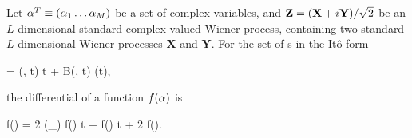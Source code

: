 \begin{theorem}
\label{thm:fpe-sde:ito-formula:ito-f-complex}
	Let $\mathbf{\alpha}^T \equiv (\alpha_1 \ldots \alpha_M)$ be a set of complex variables, and $\mathbf{Z} = (\mathbf{X} + i\mathbf{Y}) / \sqrt{2}$ be an $L$-dimensional standard complex-valued Wiener process, containing two standard $L$-dimensional Wiener processes $\mathbf{X}$ and $\mathbf{Y}$.
	For the set of s in the It\^o form
	\begin{eqn*}
		\upd\balpha = \avec(\balpha, t) \upd t + B(\balpha, t) \upd\Zvec(t),
	\end{eqn*}
	the differential of a function $f(\mathbf{\alpha})$ is
	\begin{eqn*}
		\upd f(\balpha) =
			2 \Real (\avec \cdot \vcwd_{\balpha}) f(\balpha) \upd t
			+  f(\balpha) \upd t
			+ 2 \Real {} f(\balpha).
	\end{eqn*}
\end{theorem}

